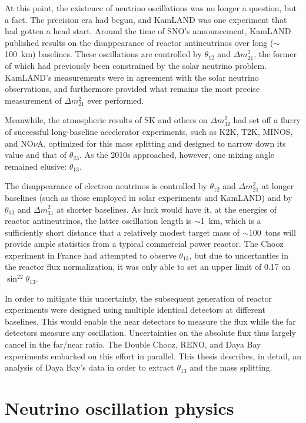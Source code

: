 \documentclass[../thesis.tex]{subfiles}
\begin{document}
At this point, the existence of neutrino oscillations was no longer a question,
but a fact. The precision era had begun, and KamLAND was one experiment that had
gotten a head start. Around the time of SNO's announcement, KamLAND published
results on the disappearance of reactor antineutrinos over long ($\sim$100~km)
baselines. These oscillations are controlled by $\theta_{12}$ and \(\Delta
m^2_{21}\), the former of which had previously been constrained by the solar
neutrino problem. KamLAND's measurements were in agreement with the solar
neutrino observations, and furthermore provided what remains the most precise
measurement of \(\Delta m^2_{21}\) ever performed.

Meanwhile, the atmospheric results of SK and others on \(\Delta m^2_{32}\) had
set off a flurry of successful long-baseline accelerator experiments, such as
K2K, T2K, MINOS, and NO$\nu$A, optimized for this mass splitting and designed to
narrow down its value and that of $\theta_{23}$. As the 2010s approached,
however, one mixing angle remained elusive: $\theta_{13}$.

The disappearance of electron neutrinos is controlled by $\theta_{12}$ and
\(\Delta m^2_{21}\) at longer baselines (such as those employed in solar
experiments and KamLAND) and by $\theta_{13}$ and \(\Delta m^2_{31}\) at shorter
baselines. As luck would have it, at the energies of reactor antineutrinos, the
latter oscillation length is $\sim$1~km, which is a sufficiently short distance
that a relatively modest target mass of $\sim$100~tons will provide ample
statistics from a typical commercial power reactor. The Chooz experiment in
France had attempted to observe $\theta_{13}$, but due to uncertanties in the
reactor flux normalization, it was only able to set an upper limit of 0.17 on
\(\sin^22\theta_{13}\).

In order to mitigate this uncertainty, the subsequent generation of reactor
experiments were designed using multiple identical detectors at different
baselines. This would enable the near detectors to measure the flux while the
far detectors measure any oscillation. Uncertainties on the absolute flux thus
largely cancel in the far/near ratio. The Double Chooz, RENO, and Daya Bay
experiments embarked on this effort in parallel. This thesis describes, in
detail, an analysis of Daya Bay's data in order to extract $\theta_{13}$ and the
mass splitting.

\section{Neutrino oscillation physics}
\label{sec:oscPhysics}
\end{document}
